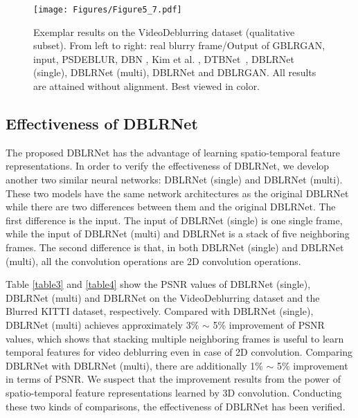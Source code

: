 \documentclass[journal]{IEEEtran}
\begin{document}
\begin{figure*}[ht]
	\centering
	\texttt{[image: Figures/Figure5\_7.pdf]}
	\caption{ Exemplar results on the VideoDeblurring dataset (qualitative subset). From left to right: real blurry frame/Output of GBLRGAN, input, PSDEBLUR, DBN \cite{su2016deep}, Kim et al. \cite{hyun2015generalized}, DTBNet~\cite{kim2017online}, DBLRNet (single), DBLRNet (multi), DBLRNet and DBLRGAN. All results are attained without alignment. Best viewed in color.}
	\label{figure5}
\end{figure*}


\subsection{Effectiveness of DBLRNet}
The proposed DBLRNet has the advantage of learning spatio-temporal feature representations. In order to verify the effectiveness of DBLRNet, we develop another two similar neural networks: DBLRNet (single) and DBLRNet (multi). These two models have the same network architectures as the original DBLRNet while there are two differences between them and the original DBLRNet. The first difference is the input. The input of DBLRNet (single) is one single frame, while the input of DBLRNet (multi) and DBLRNet is a stack of five neighboring frames. The second difference is that, in both DBLRNet (single) and DBLRNet (multi), all the convolution operations are 2D convolution operations.

Table \ref{table3} and \ref{table4} show the PSNR values of DBLRNet (single), DBLRNet (multi) and DBLRNet on the VideoDeblurring dataset and the Blurred KITTI dataset, respectively. Compared with DBLRNet (single), DBLRNet (multi) achieves approximately 3\% $\sim$ 5\% improvement of PSNR values, which shows that stacking multiple neighboring frames is useful to learn temporal features for video deblurring even in case of 2D convolution. Comparing DBLRNet with DBLRNet (multi), there are additionally 1\% $\sim$ 5\% improvement in terms of PSNR. We suspect that the improvement results from the power of spatio-temporal feature representations learned by 3D convolution. Conducting these two kinds of comparisons, the effectiveness of DBLRNet has been verified.
\end{document}
